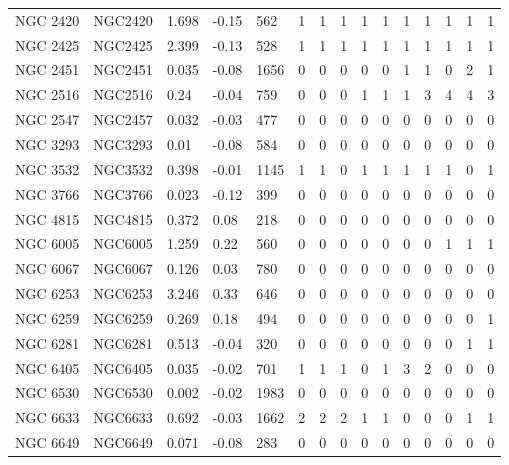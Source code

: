 \documentclass[fleqn,usenatbib]{mnras}
\begin{document}
\begin{table}
\begin{tabular}{|l l l l l || c c c c c | c c c c c|}
            NGC 2420 & NGC2420 & 1.698 & -0.15 & 562 & 1 & 1 & 1 & 1 & 1 & 1 & 1 & 1 & 1 & 1\\
            \rowcolor{lightgray}
            NGC 2425 & NGC2425 & 2.399 & -0.13 & 528 & 1 & 1 & 1 & 1 & 1 & 1 & 1 & 1 & 1 & 1\\
            \rowcolor{lightgray}
            NGC 2451 & NGC2451 & 0.035 & -0.08 & 1656 & 0 & 0 & 0 & 0 & 0 & 1 & 1 & 0 & 2 & 1\\
            \rowcolor{lightgray}
            NGC 2516 & NGC2516 & 0.24 & -0.04 & 759 & 0 & 0 & 0 & 1 & 1 & 1 & 3 & 4 & 4 & 3\\
            NGC 2547 & NGC2457 & 0.032 & -0.03 & 477 & 0 & 0 & 0 & 0 & 0 & 0 & 0 & 0 & 0 & 0\\
            NGC 3293 & NGC3293 & 0.01 & -0.08 & 584 & 0 & 0 & 0 & 0 & 0 & 0 & 0 & 0 & 0 & 0\\
            \rowcolor{lightgray}
            NGC 3532 & NGC3532 & 0.398 & -0.01 & 1145 & 1 & 1 & 0 & 1 & 1 & 1 & 1 & 1 & 0 & 1\\
            NGC 3766 & NGC3766 & 0.023 & -0.12 & 399 & 0 & 0 & 0 & 0 & 0 & 0 & 0 & 0 & 0 & 0\\
            NGC 4815 & NGC4815 & 0.372 & 0.08 & 218 & 0 & 0 & 0 & 0 & 0 & 0 & 0 & 0 & 0 & 0\\
            \rowcolor{lightgray}
            NGC 6005 & NGC6005 & 1.259 & 0.22 & 560 & 0 & 0 & 0 & 0 & 0 & 0 & 0 & 1 & 1 & 1\\
            NGC 6067 & NGC6067 & 0.126 & 0.03 & 780 & 0 & 0 & 0 & 0 & 0 & 0 & 0 & 0 & 0 & 0\\
            NGC 6253 & NGC6253 & 3.246 & 0.33 & 646 & 0 & 0 & 0 & 0 & 0 & 0 & 0 & 0 & 0 & 0\\
            \rowcolor{lightgray}
            NGC 6259 & NGC6259 & 0.269 & 0.18 & 494 & 0 & 0 & 0 & 0 & 0 & 0 & 0 & 0 & 0 & 1\\
            \rowcolor{lightgray}
            NGC 6281 & NGC6281 & 0.513 & -0.04 & 320 & 0 & 0 & 0 & 0 & 0 & 0 & 0 & 0 & 1 & 1\\
            \rowcolor{lightgray}
            NGC 6405 & NGC6405 & 0.035 & -0.02 & 701 & 1 & 1 & 1 & 0 & 1 & 3 & 2 & 0 & 0 & 0\\
            NGC 6530 & NGC6530 & 0.002 & -0.02 & 1983 & 0 & 0 & 0 & 0 & 0 & 0 & 0 & 0 & 0 & 0\\
            \rowcolor{lightgray}
            NGC 6633 & NGC6633 & 0.692 & -0.03 & 1662 & 2 & 2 & 2 & 1 & 1 & 0 & 0 & 0 & 1 & 1\\
            NGC 6649 & NGC6649 & 0.071 & -0.08 & 283 & 0 & 0 & 0 & 0 & 0 & 0 & 0 & 0 & 0 & 0\\

\end{tabular}
\end{table}
\end{document}
